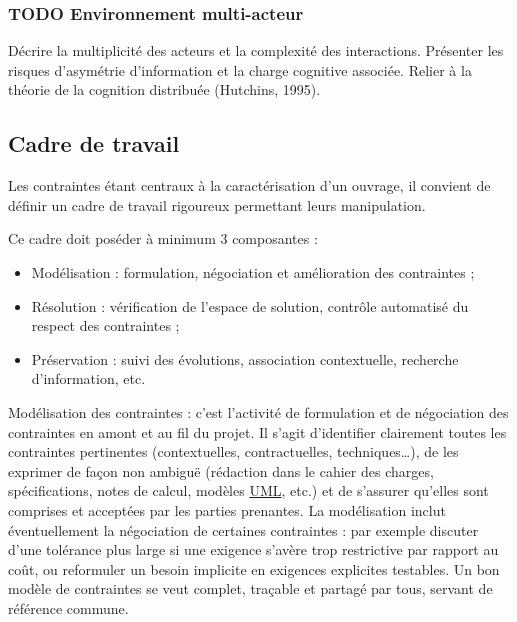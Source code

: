 \documentclass[a4paper,12pt]{article}
\begin{document}
\subsubsection{{\bfseries\sffamily TODO} Environnement multi-acteur}
\label{sec:orgf5c4e06}
Décrire la multiplicité des acteurs et la complexité des interactions.  
Présenter les risques d’asymétrie d’information et la charge cognitive associée.  
Relier à la théorie de la cognition distribuée (Hutchins, 1995).
\subsection{Cadre de travail}
\label{sec:orgcead265}
Les contraintes étant centraux à la caractérisation d'un ouvrage, il convient de définir un cadre de travail rigoureux permettant leurs manipulation.

Ce cadre doit poséder à minimum 3 composantes :
\begin{itemize}
\item Modélisation : formulation, négociation et amélioration des contraintes ;
\item Résolution : vérification de l'espace de solution, contrôle automatisé du respect des contraintes ;
\item Préservation : suivi des évolutions, association contextuelle, recherche d'information, etc.
\end{itemize}

Modélisation des contraintes : c’est l’activité de formulation et de négociation des contraintes en amont et au fil du projet. Il s’agit d’identifier clairement toutes les contraintes pertinentes (contextuelles, contractuelles, techniques…), de les exprimer de façon non ambiguë (rédaction dans le cahier des charges, spécifications, notes de calcul, modèles \protect\hyperlink{gls-18}{\label{gls-18-use-2}UML}, etc.) et de s’assurer qu’elles sont comprises et acceptées par les parties prenantes. La modélisation inclut éventuellement la négociation de certaines contraintes : par exemple discuter d’une tolérance plus large si une exigence s’avère trop restrictive par rapport au coût, ou reformuler un besoin implicite en exigences explicites testables. Un bon modèle de contraintes se veut complet, traçable et partagé par tous, servant de référence commune.
\end{document}
